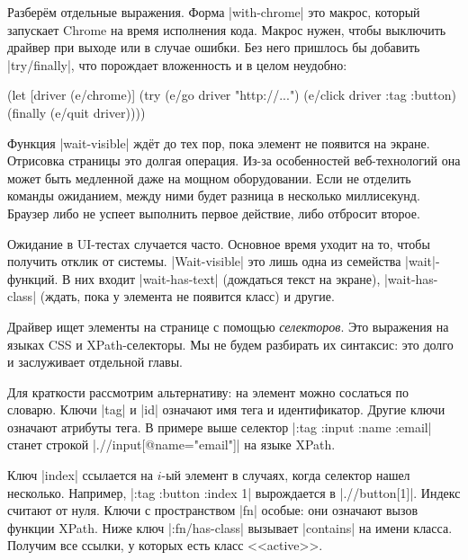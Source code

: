 Разберём отдельные выражения. Форма \spverb|with-chrome| это макрос, который
запускает Chrome на время исполнения кода. Макрос нужен, чтобы выключить драйвер
при выходе или в случае ошибки. Без него пришлось бы добавить
\spverb|try/finally|, что порождает вложенность и в целом неудобно:


\begin{english}
  \begin{clojure}
(let [driver (e/chrome)]
  (try
    (e/go driver "http://...")
    (e/click driver {:tag :button})
    (finally
      (e/quit driver))))
  \end{clojure}
\end{english}


Функция \spverb|wait-visible| ждёт до тех пор, пока элемент не появится на
экране. Отрисовка страницы это долгая операция. Из-за особенностей
веб-технологий она может быть медленной даже на мощном оборудовании. Если не
отделить команды ожиданием, между ними будет разница в несколько
миллисекунд. Браузер либо не успеет выполнить первое действие, либо отбросит
второе.

Ожидание в UI-тестах случается часто. Основное время уходит на то, чтобы
получить отклик от системы. \spverb|Wait-visible| это лишь одна из семейства
\spverb|wait|-функций. В них входит \spverb|wait-has-text| (дождаться текст на
экране), \spverb|wait-has-class| (ждать, пока у элемента не появится класс) и
другие.


Драйвер ищет элементы на странице с помощью \emph{селекторов}. Это выражения на
языках CSS и
XPath-селекторы. Мы не
будем разбирать их синтаксис: это долго и заслуживает отдельной главы.

Для краткости рассмотрим альтернативу: на элемент можно сослаться по
словарю. Ключи \spverb|tag| и \spverb|id| означают имя тега и
идентификатор. Другие ключи означают атрибуты тега. В примере выше селектор
\spverb|{:tag :input :name :email}| станет строкой
\spverb|.//input[@name="email"]| на языке XPath.


Ключ \spverb|index| ссылается на $i$-ый элемент в случаях, когда селектор нашел
несколько. Например, \spverb|{:tag :button :index 1}| вырождается в
\spverb|.//button[1]|. Индекс считают от нуля. Ключи с пространством \spverb|fn|
особые: они означают вызов функции XPath. Ниже ключ \spverb|:fn/has-class|
вызывает \spverb|contains| на имени класса. Получим все ссылки, у которых есть
класс <<active>>.

